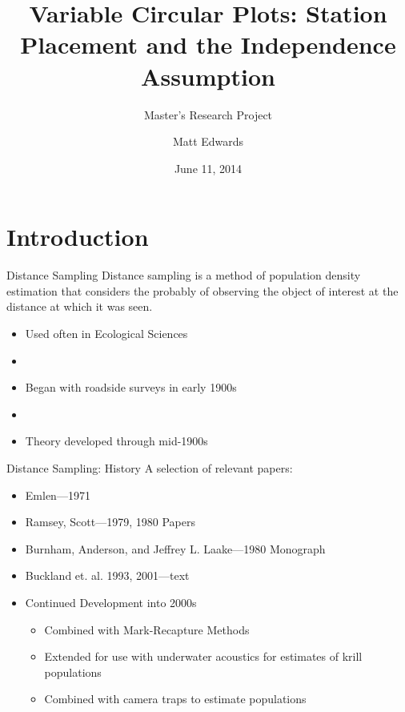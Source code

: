 \documentclass{beamer}
\title{Variable Circular Plots: Station Placement and the Independence Assumption}
\subtitle{Master's Research Project}
\author{Matt Edwards}
\date{June 11, 2014}
\begin{document}
\begin{frame}
	\titlepage
\end{frame}


\section{Introduction}

\begin{frame}{Distance Sampling}
Distance sampling is a method of population density estimation that considers the probably of observing the object of interest at the distance at which it was seen.

	\begin{itemize}
	\item Used often in Ecological Sciences
	\item[]
	\item Began with roadside surveys in early 1900s
	\item[]
	\item Theory developed through mid-1900s
	
	\end{itemize}
\end{frame}

\begin{frame}{Distance Sampling: History}
A selection of relevant papers:
	\begin{itemize}
	\item Emlen---1971
	\item Ramsey, Scott---1979, 1980 Papers
	\item Burnham, Anderson, and Jeffrey L. Laake---1980 Monograph
	\item Buckland et. al. 1993, 2001---text
	\item Continued Development into 2000s
	\begin{itemize}
	\item Combined with Mark-Recapture Methods
	\item Extended for use with underwater acoustics for estimates of krill populations 
	\item Combined with camera traps to estimate populations
	\end{itemize}
	\end{itemize}
\end{frame}
\end{document}
